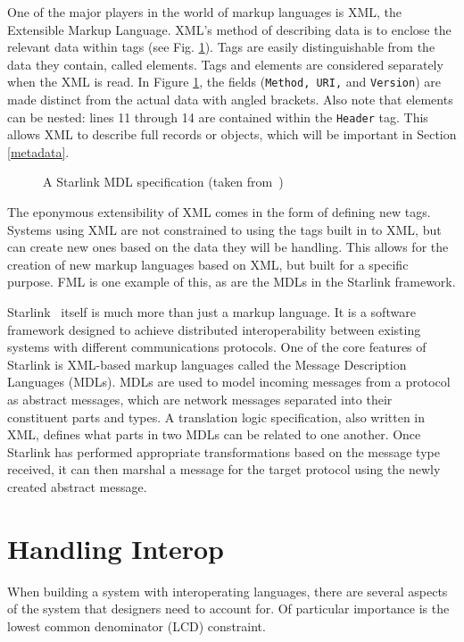 \documentclass{sig-alternate}
\begin{document}
One of the major players in the world of markup languages is XML, the Extensible Markup Language. XML's method of describing data is to enclose the relevant data within tags (see Fig. \ref{MDL1}). Tags are easily distinguishable from the data they contain, called elements. Tags and elements are considered separately when the XML is read. In Figure \ref{MDL1}, the fields ({\tt Method, URI,} and {\tt Version}) are made distinct from the actual data with angled brackets.
Also note that elements can be nested: lines 11 through 14 are contained within the {\tt Header} tag. This allows XML to describe full records or objects, which will be important in Section \ref{metadata}.


\begin{figure}
\caption{A Starlink MDL specification (taken from~\cite{Bromberg:2011})}
\label{MDL1}
\end{figure}


The eponymous extensibility of XML comes in the form of defining new tags. Systems using XML are not constrained to using the tags built in to XML, but can create new ones based on the data they will be handling. This allows for the creation of new markup languages based on XML, but built for a specific purpose. FML is one example of this, as are the MDLs in the Starlink framework.

Starlink~\cite{Bromberg:2011} itself is much more than just a markup language. It is a software framework designed to achieve distributed interoperability between existing systems with different communications protocols. One of the core features of Starlink is XML-based markup languages called the Message Description Languages (MDLs). MDLs are used to model incoming messages from a protocol as abstract messages, which are network messages separated into their constituent parts and types. A translation logic specification, also written in XML, defines what parts in two MDLs can be related to one another. Once Starlink has performed appropriate transformations based on the message type received, it can then marshal a message for the target protocol using the newly created abstract message.

\section{Handling Interop}\label{approaches}
When building a system with interoperating languages, there are several aspects of the system that designers need to account for. Of particular importance is the lowest common denominator (LCD) constraint.
\end{document}
